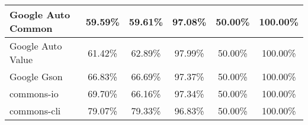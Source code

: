\documentclass[../main]{subfiles}
\begin{document}
\begin{table}[htb]
\begin{tabular}{|l|c|c|c|c|c|}
Google Auto Common            & 59.59\%                                                                                 & 59.61\%                                                                                     & 97.08\%                                                                              & 50.00\%                                                                               & 100.00\%                                                                             \\ \hline
Google Auto Value             & 61.42\%                                                                                 & 62.89\%                                                                                     & 97.99\%                                                                              & 50.00\%                                                                               & 100.00\%                                                                             \\ \hline
Google Gson                   & 66.83\%                                                                                 & 66.69\%                                                                                     & 97.37\%                                                                              & 50.00\%                                                                               & 100.00\%                                                                             \\ \hline
commons-io                    & 69.70\%                                                                                 & 66.16\%                                                                                     & 97.34\%                                                                              & 50.00\%                                                                               & 100.00\%                                                                             \\ \hline
commons-cli                   & 79.07\%                                                                                 & 79.33\%                                                                                     & 96.83\%                                                                              & 50.00\%                                                                               & 100.00\%                                                                             \\ \hline

\end{tabular}
\end{table}
\end{document}
